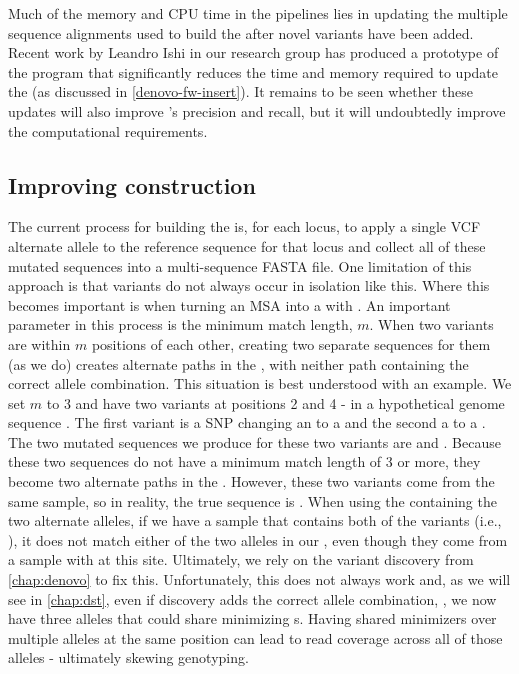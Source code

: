 Much of the memory and CPU time in the \pandora{} pipelines lies in updating the multiple sequence alignments used to build the \prg{} after novel variants have been added. Recent work by Leandro Ishi in our research group has produced a prototype of the \makeprg{} program that significantly reduces the time and memory required to update the \prg{} (as discussed in \autoref{denovo-fw-insert}). It remains to be seen whether these updates will also improve \pandora{}'s precision and recall, but it will undoubtedly improve the computational requirements. 

\subsection{Improving \prg{} construction}
\label{sec:improve-prg}
The current process for building the \mtb{} \prg{} is, for each locus, to apply a single VCF alternate allele to the reference sequence for that locus and collect all of these mutated sequences into a multi-sequence FASTA file. One limitation of this approach is that variants do not always occur in isolation like this. Where this becomes important is when turning an MSA into a \prg{} with \makeprg{}. An important parameter in this process is the minimum match length, $m$. When two variants are within $m$ positions of each other, creating two separate sequences for them (as we do) creates alternate paths in the \prg{}, with neither path containing the correct allele combination. This situation is best understood with an example. We set $m$ to 3 and have two variants at positions 2 and 4 - in a hypothetical genome sequence . The first variant is a SNP changing an  to a  and the second a  to a . The two mutated sequences we produce for these two variants are  and . Because these two sequences do not have a minimum match length of 3 or more, they become two alternate paths in the \prg{}. However, these two variants come from the same sample, so in reality, the true sequence is . When using the \prg{} containing the two alternate alleles, if we have a sample that contains both of the variants (i.e., ), it does not match either of the two alleles in our \prg{}, even though they come from a sample with  at this site. Ultimately, we rely on the \denovo{} variant discovery from \autoref{chap:denovo} to fix this. Unfortunately, this does not always work and, as we will see in \autoref{chap:dst}, even if \denovo{} discovery adds the correct allele combination, , we now have three alleles that could share minimizing \kmer{}s. Having shared minimizers over multiple alleles at the same position can lead to read coverage across all of those alleles - ultimately skewing genotyping. 

